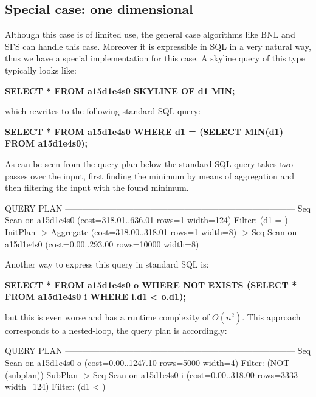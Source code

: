 \subsection{Special case: one dimensional}
\label{sec:onedim-nondistinct}
Although this case is of limited use, the general case algorithms like
BNL and SFS can handle this case. Moreover it is expressible in
SQL in a very natural way, thus we have a special implementation for this
case.  A skyline query of this type typically looks like:

\begin{interactive}
\textbf{SELECT * FROM a15d1e4s0 SKYLINE OF d1 MIN;}
\end{interactive}

\noindent
which rewrites to the following standard SQL query:

\begin{interactive}
\textbf{SELECT * FROM a15d1e4s0 WHERE d1 = (SELECT MIN(d1) FROM a15d1e4s0);}
\end{interactive}

\noindent
As can be seen from the query plan below the standard SQL query takes
two passes over the input, first finding the minimum by means of
aggregation and then filtering the input with the found minimum.

\begin{interactive}
                                    QUERY PLAN                                   
---------------------------------------------------------------------------------
 Seq Scan on a15d1e4s0  (cost=318.01..636.01 rows=1 width=124)
   Filter: (d1 = )
   InitPlan
     ->  Aggregate  (cost=318.00..318.01 rows=1 width=8)
           ->  Seq Scan on a15d1e4s0  (cost=0.00..293.00 rows=10000 width=8)
\end{interactive}

\noindent
Another way to express this query in standard SQL is:

\begin{interactive}
\textbf{SELECT * FROM a15d1e4s0 o WHERE NOT EXISTS
    (SELECT * FROM a15d1e4s0 i WHERE i.d1 < o.d1);}
\end{interactive}

\noindent
but this is even worse and has a runtime complexity of $O(n^2)$. This
approach corresponds to a \naive nested-loop, the query plan is
accordingly:

\begin{interactive}
                                    QUERY PLAN                                   
---------------------------------------------------------------------------------
 Seq Scan on a15d1e4s0 o  (cost=0.00..1247.10 rows=5000 width=4)
   Filter: (NOT (subplan))
   SubPlan
     ->  Seq Scan on a15d1e4s0 i  (cost=0.00..318.00 rows=3333 width=124)
           Filter: (d1 < )
\end{interactive}


